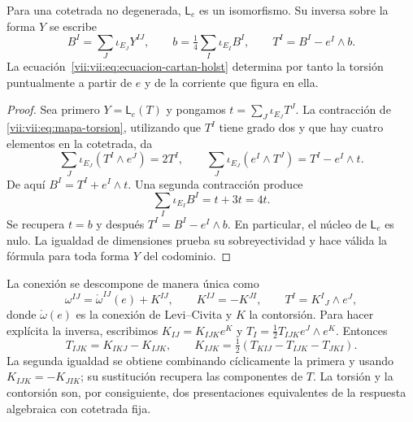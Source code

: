 \begin{theorem}
\label{vii:vii:thm:inversion-torsion}
Para una cotetrada no degenerada, \(\mathsf L_e\) es un isomorfismo.
Su inversa sobre la forma \(Y\) se escribe
\begin{equation}
 B^I=\sum_J\iota_{E_J}Y^{IJ},\qquad
 b=\tfrac14\sum_I\iota_{E_I}B^I,\qquad
 T^I=B^I-e^I\wedge b.
 \label{vii:vii:eq:torsion-explicita}
\end{equation}
La ecuación~\eqref{vii:vii:eq:ecuacion-cartan-holst} determina por tanto
la torsión puntualmente a partir de \(e\) y de la corriente que figura
en ella.
\end{theorem}
\begin{proof}
Sea primero \(Y=\mathsf L_e(T)\) y pongamos
\(t=\sum_J\iota_{E_J}T^J\). La contracción de
\eqref{vii:vii:eq:mapa-torsion}, utilizando que \(T^I\) tiene grado dos
y que hay cuatro elementos en la cotetrada, da
\[
 \sum_J\iota_{E_J}(T^I\wedge e^J)=2T^I,
 \qquad
 \sum_J\iota_{E_J}(e^I\wedge T^J)=T^I-e^I\wedge t.
\]
De aquí \(B^I=T^I+e^I\wedge t\). Una segunda contracción produce
\[
 \sum_I\iota_{E_I}B^I=t+3t=4t.
\]
Se recupera \(t=b\) y después \(T^I=B^I-e^I\wedge b\).
En particular, el núcleo de \(\mathsf L_e\) es nulo. La igualdad
de dimensiones prueba su sobreyectividad y hace válida la fórmula
para toda forma \(Y\) del codominio.
\end{proof}

La conexión se descompone de manera única como
\begin{equation}
 \omega^{IJ}=\mathring\omega^{IJ}(e)+K^{IJ},\qquad
 K^{IJ}=-K^{JI},\qquad T^I=K^I{}_{J}\wedge e^J,
 \label{vii:vii:eq:contorsion}
\end{equation}
donde \(\mathring\omega(e)\) es la conexión de Levi--Civita y
\(K\) la contorsión. Para hacer explícita la inversa, escribimos
\(K_{IJ}=K_{IJK}e^K\) y
\(T_I=\tfrac12T_{IJK}e^J\wedge e^K\). Entonces
\begin{equation}
 T_{IJK}=K_{IKJ}-K_{IJK},\qquad
 K_{IJK}=\tfrac12(T_{KIJ}-T_{IJK}-T_{JKI}).
 \label{vii:vii:eq:contorsion-componentes}
\end{equation}
La segunda igualdad se obtiene combinando cíclicamente la primera y
usando \(K_{IJK}=-K_{JIK}\); su sustitución recupera las componentes
de \(T\). La torsión y la contorsión son, por consiguiente, dos
presentaciones equivalentes de la respuesta algebraica con cotetrada fija.

